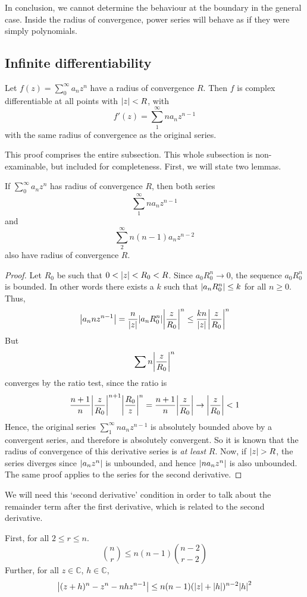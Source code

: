 In conclusion, we cannot determine the behaviour at the boundary in the general case.
Inside the radius of convergence, power series will behave as if they were simply polynomials.

\subsection{Infinite differentiability}
\begin{theorem}
	Let \(f(z) = \sum_0^\infty a_n z^n\) have a radius of convergence \(R\).
	Then \(f\) is complex differentiable at all points with \(\abs{z} < R\), with
	\[
		f'(z) = \sum_1^\infty n a_n z^{n-1}
	\]
	with the same radius of convergence as the original series.
\end{theorem}
This proof comprises the entire subsection.
This whole subsection is non-examinable, but included for completeness.
First, we will state two lemmas.
\begin{lemma}
	If \(\sum_0^\infty a_n z^n\) has radius of convergence \(R\), then both series
	\[
		\sum_1^\infty n a_n z^{n-1}
	\]
	and
	\[
		\sum_2^\infty n(n-1)a_n z^{n-2}
	\]
	also have radius of convergence \(R\).
\end{lemma}
\begin{proof}
	Let \(R_0\) be such that \(0 < \abs{z} < R_0 < R\).
	Since \(a_0 R_0^n \to 0\), the sequence \(a_0 R_0^n\) is bounded.
	In other words there exists a \(k\) such that \(\abs{a_n R_0^n} \leq k\) for all \(n \geq 0\).
	Thus,
	\[
		\abs{a_n n z^{n-1}} = \frac{n}{\abs{z}}\abs{a_n R_0^n} \abs{\frac{z}{R_0}}^n \leq \frac{kn}{\abs{z}}\abs{\frac{z}{R_0}}^n
	\]
	But
	\[
		\sum n\abs{\frac{z}{R_0}}^n
	\]
	converges by the ratio test, since the ratio is
	\[
		\frac{n+1}{n}\abs{\frac{z}{R_0}}^{n+1} \abs{\frac{R_0}{z}}^n = \frac{n+1}{n}\abs{\frac{z}{R_0}} \to \abs{\frac{z}{R_0}} < 1
	\]
	Hence, the original series \(\sum_1^\infty n a_n z^{n-1}\) is absolutely bounded above by a convergent series, and therefore is absolutely convergent.
	So it is known that the radius of convergence of this derivative series is \textit{at least} \(R\).
	Now, if \(\abs{z} > R\), the series diverges since \(\abs{a_n z^n}\) is unbounded, and hence \(\abs{n a_n z^n}\) is also unbounded.
	The same proof applies to the series for the second derivative.
\end{proof}
We will need this `second derivative' condition in order to talk about the remainder term after the first derivative, which is related to the second derivative.
\begin{lemma}
	First, for all \(2 \leq r \leq n\).
	\[
		\binom{n}{r} \leq n(n-1)\binom{n-2}{r-2}
	\]
	Further, for all \(z \in \mathbb C\), \(h \in \mathbb C\),
	\[
		\abs{(z + h)^n - z^n - nhz^{n-1}} \leq n(n-1)(\abs{z} + \abs{h})^{n-2}\abs{h}^2
	\]
\end{lemma}
